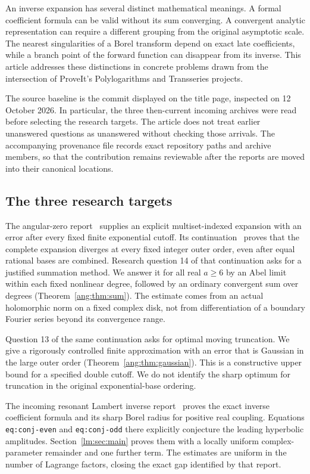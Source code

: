 \documentclass[11pt,a4paper]{article}
\theoremstyle{definition}
\theoremstyle{remark}
\numberwithin{equation}{section}
\newcommand{\repo}{\textsf{ProveIt}}
\begin{document}
An inverse expansion has several distinct mathematical meanings. A
formal coefficient formula can be valid without its sum converging.
A convergent analytic representation can require a different grouping
from the original asymptotic scale. The nearest singularities of a
Borel transform depend on exact late coefficients, while a branch point
of the forward function can disappear from its inverse. This article
addresses these distinctions in concrete problems drawn from the
intersection of \repo's Polylogarithms and Transseries projects.

The source baseline is the commit displayed on the title page, inspected
on 12 October 2026. In particular, the three then-current incoming
archives were read before selecting the research targets. The article
does not treat earlier unanswered questions as unanswered without
checking those arrivals. The accompanying provenance file records exact
repository paths and archive members, so that the contribution remains
reviewable after the reports are moved into their canonical locations.

\subsection{The three research targets}

The angular-zero report~\cite{RepoAngular} supplies an explicit
multiset-indexed expansion with an error after every fixed finite
exponential cutoff. Its continuation~\cite{RepoFormal} proves that the
complete expansion diverges at every fixed integer outer order, even
after equal rational bases are combined. Research question 14 of that
continuation asks for a justified summation method. We answer it for
all real $a\ge6$ by an Abel limit within each fixed nonlinear degree,
followed by an ordinary convergent sum over degrees
(Theorem~\ref{ang:thm:sum}). The estimate comes from an actual
holomorphic norm on a fixed complex disk, not from differentiation of
a boundary Fourier series beyond its convergence range.

Question 13 of the same continuation asks for optimal moving
truncation. We give a rigorously controlled finite approximation with
an error that is Gaussian in the large outer order
(Theorem~\ref{ang:thm:gaussian}). This is a constructive upper bound
for a specified double cutoff. We do not identify the sharp optimum
for truncation in the original exponential-base ordering.

The incoming resonant Lambert inverse report~\cite{RepoLambert}
proves the exact inverse coefficient formula and its sharp Borel
radius for positive real coupling. Equations
\texttt{eq:conj-even} and \texttt{eq:conj-odd} there explicitly
conjecture the leading hyperbolic amplitudes. Section~\ref{lm:sec:main}
proves them with a locally uniform complex-parameter remainder and
one further term. The estimates are uniform in the number of
Lagrange factors, closing the exact gap identified by that report.
\end{document}
